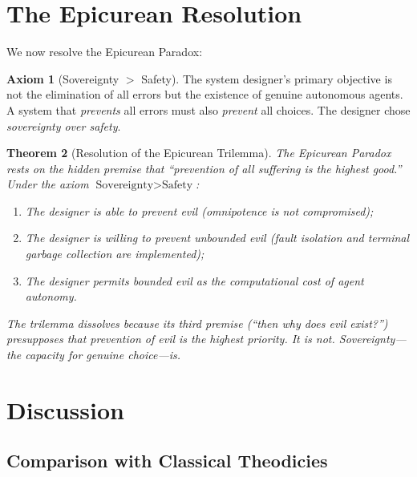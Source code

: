 \documentclass[12pt, a4paper]{article}
\theoremstyle{plain}
\newtheorem{theorem}{Theorem}[section]
\theoremstyle{definition}
\newtheorem{axiom}[theorem]{Axiom}
\theoremstyle{remark}
\begin{document}
\section{The Epicurean Resolution}\label{sec:resolution}

We now resolve the Epicurean Paradox:

\begin{axiom}[Sovereignty $>$ Safety]\label{ax:sovereignty}
  The system designer's primary objective is not the elimination of all
  errors but the existence of genuine autonomous agents. A system that
  \emph{prevents} all errors must also \emph{prevent} all choices. The
  designer chose \emph{sovereignty over safety}.
\end{axiom}

\begin{theorem}[Resolution of the Epicurean Trilemma]\label{thm:epicurus}
  The Epicurean Paradox rests on the hidden premise that ``prevention of
  all suffering is the highest good.'' Under the axiom
  $\text{Sovereignty} > \text{Safety}$:
  \begin{enumerate}[label=(\alph*)]
    \item The designer \emph{is} able to prevent evil (omnipotence is
      not compromised);
    \item The designer \emph{is} willing to prevent unbounded evil
      (fault isolation and terminal garbage collection are implemented);
    \item The designer \emph{permits} bounded evil as the computational
      cost of agent autonomy.
  \end{enumerate}
  The trilemma dissolves because its third premise (``then why does evil
  exist?'') presupposes that prevention of evil is the highest priority.
  It is not. \emph{Sovereignty}---the capacity for genuine choice---is.
\end{theorem}

\section{Discussion}\label{sec:discussion}

\subsection{Comparison with Classical Theodicies}
\end{document}
